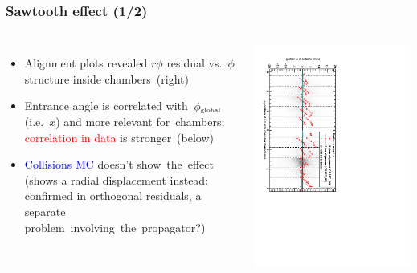 \documentclass[compress]{beamer}
\begin{document}
\begin{frame}
\frametitle{Sawtooth effect (1/2)}

\begin{columns}
\begin{itemize}
\item Alignment plots revealed $r\phi$ residual vs.~$\phi$ structure inside \mbox{chambers (right)\hspace{-1 cm}}
\item Entrance angle is correlated \mbox{with $\phi_{\mbox{\tiny global}}$\hspace{-0.5 cm}} (i.e.~$x$) and more relevant \mbox{for chambers;\hspace{-1 cm}}
\textcolor{red}{correlation in data} is \mbox{stronger (below)\hspace{-1 cm}}
\item \textcolor{blue}{Collisions MC} doesn't \mbox{show the effect\hspace{-0.5 cm}} (shows a radial
  displacement instead: confirmed in orthogonal residuals, a separate
  \mbox{problem involving the propagator?)\hspace{-3 cm}}
\end{itemize}

\includegraphics[height=\linewidth, angle=90]{alignmentplots_example2.pdf}
\end{columns}


\end{frame}
\end{document}
